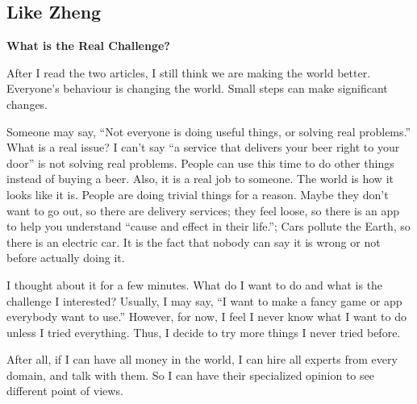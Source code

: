 \documentclass[12pt,letterpaper]{article}
\begin{document}
\subsection{Like Zheng}
\textbf{What is the Real Challenge?}\par
After I read the two articles, I still think we are making the world better. Everyone’s behaviour is changing the world. Small steps can make significant changes. \par
Someone may say, “Not everyone is doing useful things, or solving real problems.” What is a real issue? I can’t say “a service that delivers your beer right to your door” is not solving real problems. People can use this time to do other things instead of buying a beer. Also, it is a real job to someone. The world is how it looks like it is. People are doing trivial things for a reason. Maybe they don’t want to go out, so there are delivery services; they feel loose, so there is an app to help you understand “cause and effect in their life.”; Cars pollute the Earth, so there is an electric car. It is the fact that nobody can say it is wrong or not before actually doing it.\par
I thought about it for a few minutes. What do I want to do and what is the challenge I interested? Usually, I may say, “I want to make a fancy game or app everybody want to use.” However, for now, I feel I never know what I want to do unless I tried everything. Thus, I decide to try more things I never tried before.\par
After all, if I can have all money in the world, I can hire all experts from every domain, and talk with them. So I can have their specialized opinion to see different point of views. 

\clearpage
\end{document}

